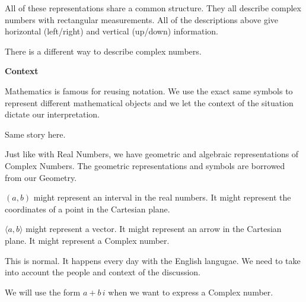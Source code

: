 \documentclass{ximera}
\begin{document}
\begin{image}
\end{image}






All of these representations share a common structure.  They all describe complex numbers with rectangular measurements.  All of the descriptions above give horizontal (left/right) and vertical (up/down) information.


There is a different way to describe complex numbers.






\begin{warning} \textbf{\textcolor{red!70!black}{Context}}


Mathematics is famous for reusing notation.  We use the exact same symbols to represent different mathematical objects and we let the context of the situation dictate our interpretation. 

Same story here. 

Just like with Real Numbers, we have geometric and algebraic representations of Complex Numbers.  The geometric representations and symbols are borrowed from our Geometry.


$(a, b)$ might represent an interval in the real numbers.  It might represent the coordinates of a point in the Cartesian plane.  


$\langle a, b \rangle$ might represent a vector.  It might represent an arrow in the Cartesian plane.  It might represent a Complex number. 


This is normal. It happens every day with the English langugae.  We need to take into account the people and context of the discussion.

We will use the form $a + b \, i$ when we want to express a Complex number.

\end{warning}
\end{document}

